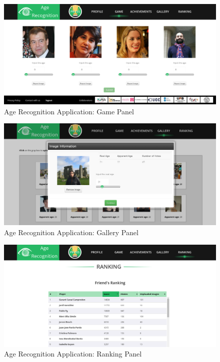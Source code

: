 \begin{figure}[!h]
	\centering
	\includegraphics[width=\textwidth]{figures/age_app_1}
	\caption{Age Recognition Application: Game Panel}
	\label{fig:game}
\end{figure}

\begin{figure}[!h]
	\centering
	\includegraphics[width=\textwidth]{figures/age_app_2}
	\caption{Age Recognition Application: Gallery Panel}
	\label{fig:gallery}
\end{figure}

\begin{figure}[!h]
	\centering
	\includegraphics[width=\textwidth]{figures/age_app_3}
	\caption{Age Recognition Application: Ranking Panel}
	\label{fig:ranking}
\end{figure}

